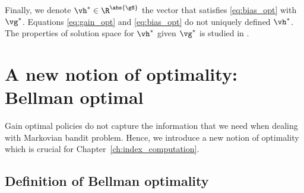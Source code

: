 Finally, we denote $\vh^*\in\R^{\abs{\gS}}$ the vector that satisfies \eqref{eq:bias_opt} with $\vg^*$.
Equations \eqref{eq:gain_opt} and \eqref{eq:bias_opt} do not uniquely defined $\vh^*$.
The properties of solution space for $\vh^*$ given $\vg^*$ is studied in \cite{schweitzer1978functional}.

\section{A new notion of optimality: Bellman optimal}
\label{ch:mdp:sec:bell}

Gain optimal policies do not capture the information that we need when dealing with Markovian bandit problem.
Hence, we introduce a new notion of optimality which is crucial for Chapter~\ref{ch:index_computation}.

\subsection{Definition of Bellman optimality}

